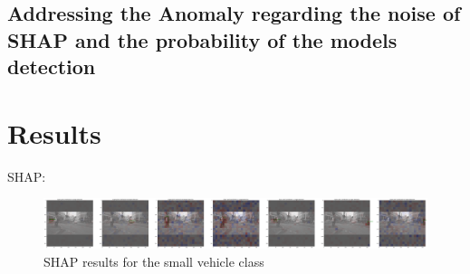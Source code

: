\subsection{Addressing the Anomaly regarding the noise of SHAP and the probability of the models detection}\label{subsec:Addressing the Anomaly regarding SHAP and the probability of detection}

\section{Results}\label{sec:results}
SHAP:
\begin{figure}[h]
\includegraphics[width=1.0\textwidth]{figures/output1}
\caption{SHAP results for the small vehicle class}\label{fig:SHAP_results1}
\end{figure}

